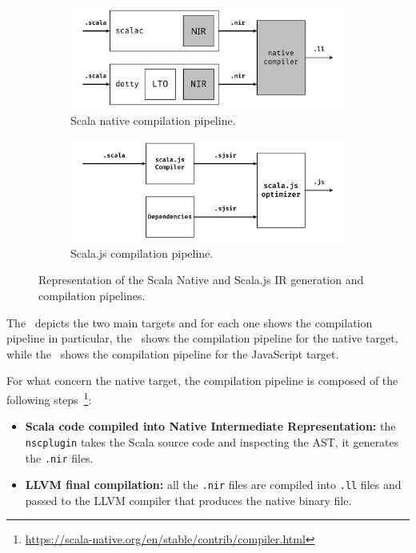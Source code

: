 \begin{figure}[ht]
	\centering
	\begin{subfigure}{.45\textwidth}
		\centering
		\includegraphics[width=\linewidth]{figures/scala-native-pipeline.pdf}
		\caption{Scala native compilation pipeline.}
		\label{fig:scala-native-ir}
	\end{subfigure}
	\begin{subfigure}{.45\textwidth}
		\centering
		\includegraphics[width=\linewidth]{figures/scala-js-pipeline.pdf}
		\caption{Scala.js compilation pipeline.}
		\label{fig:scala-js-ir}
	\end{subfigure}
	\caption{Representation of the Scala Native and Scala.js IR generation and compilation pipelines.}
	\label{fig:scala-ir}
\end{figure}

The~ depicts the two main targets and for each one shows the compilation pipeline in particular, the~
shows the compilation pipeline for the native target, while the~ shows the compilation pipeline for the JavaScript target.

For what concern the native target, the compilation pipeline is composed of the following steps~\footnote{\url{https://scala-native.org/en/stable/contrib/compiler.html}}:
\begin{itemize}
	\item \textbf{Scala code compiled into Native Intermediate Representation:} the \texttt{nscplugin} takes the Scala source code and inspecting the
	      AST, it generates the \texttt{.nir} files.
	\item \textbf{LLVM final compilation:} all the \texttt{.nir} files are compiled into \texttt{.ll} files and passed to the LLVM compiler that
	      produces the native binary file.
\end{itemize}

